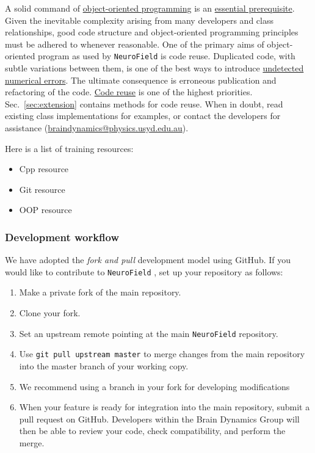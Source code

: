 \documentclass[12pt,a4paper]{article}
\newcommand{\type}[1]{{\small\small\tt #1} }
\newcommand{\NF}[0]{\type{NeuroField}}
\begin{document}
A solid command of \underline{object-oriented programming} is an \underline{essential prerequisite}. Given the inevitable complexity arising from many developers and class relationships, good code structure and object-oriented programming principles must be adhered to whenever reasonable. One of the primary aims of object-oriented program as used by \NF is code reuse. Duplicated code, with subtle variations between them, is one of the best ways to introduce \underline{undetected numerical errors}. The ultimate consequence is erroneous publication and refactoring of the code. \underline{Code reuse} is one of the highest priorities. Sec.~\ref{sec:extension} contains methods for code reuse. When in doubt, read existing class implementations for examples, or contact the developers for assistance (\url{braindynamics@physics.usyd.edu.au}).

Here is a list of training resources:

\begin{itemize}
	\item Cpp resource
	\item Git resource 
	\item OOP resource
\end{itemize}

\subsubsection{Development workflow}

We have adopted the {\em fork and pull} development model using GitHub. If you would like to contribute to \NF, set up your repository as follows:

\begin{enumerate}
	\item Make a private fork of the main repository.
	\item Clone your fork.
	\item Set an upstream remote pointing at the main \NF repository.
	\item Use \type{git pull upstream master} to merge changes from the main repository into the master branch of your working copy.
	\item We recommend using a branch in your fork for developing modifications
	\item When your feature is ready for integration into the main repository, submit a pull request on GitHub. Developers within the Brain Dynamics Group will then be able to review your code, check compatibility, and perform the merge. 
\end{enumerate}
\end{document}
